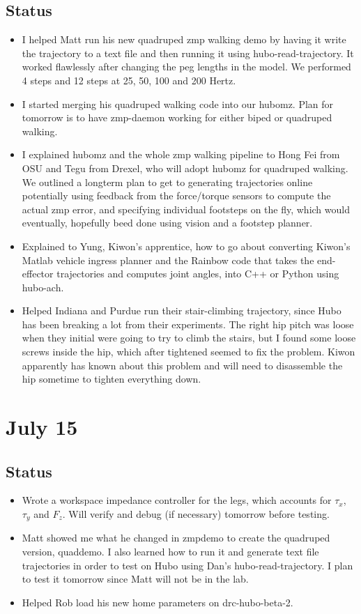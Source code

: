 \documentclass[letterpaper, 10 pt]{report}
\begin{document}
\subsection*{Status}
\begin{itemize}
\item I helped Matt run his new quadruped zmp walking demo by having it write the trajectory to a text file and then running it using hubo-read-trajectory. It worked flawlessly after changing the peg lengths in the model. We performed 4 steps and 12 steps at 25, 50, 100 and 200 Hertz.
\item I started merging his quadruped walking code into our hubomz. Plan for tomorrow is to have zmp-daemon working for either biped or quadruped walking.
\item I explained hubomz and the whole zmp walking pipeline to Hong Fei from OSU and Tegu from Drexel, who will adopt hubomz for quadruped walking. We outlined a longterm plan to get to generating trajectories online potentially using feedback from the force/torque sensors to compute the actual zmp error, and specifying individual footsteps on the fly, which would eventually, hopefully beed done using vision and a footstep planner.
\item Explained to Yung, Kiwon's apprentice, how to go about converting Kiwon's Matlab vehicle ingress planner and the Rainbow code that takes the end-effector trajectories and computes joint angles, into C++ or Python using hubo-ach.
\item Helped Indiana and Purdue run their stair-climbing trajectory, since Hubo has been breaking a lot from their experiments. The right hip pitch was loose when they initial were going to try to climb the stairs, but I found some loose screws inside the hip, which after tightened seemed to fix the problem. Kiwon apparently has known about this problem and will need to disassemble the hip sometime to tighten everything down.
\end{itemize}

\section*{July 15}
\subsection*{Status}
\begin{itemize}
\item Wrote a workspace impedance controller for the legs, which accounts for $\tau_x$, $\tau_y$ and $F_z$. Will verify and debug (if necessary) tomorrow before testing.
\item Matt showed me what he changed in zmpdemo to create the quadruped version, quaddemo. I also learned how to run it and generate text file trajectories in order to test on Hubo using Dan's hubo-read-trajectory. I plan to test it tomorrow since Matt will not be in the lab.
\item Helped Rob load his new home parameters on drc-hubo-beta-2.
\end{itemize}
\end{document}
